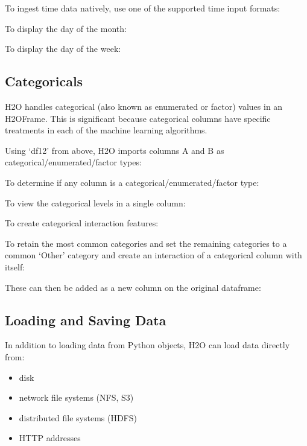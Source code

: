 {To ingest time data natively, use one of the supported time input formats:


To display the day of the month:


To display the day of the week:


\subsection{Categoricals}
H2O handles categorical (also known as enumerated or factor) values in an H2OFrame.  This is significant because categorical
columns have specific treatments in each of the machine learning algorithms.

Using `df12' from above, H2O imports columns A and B as categorical/enumerated/factor types:


To determine if any column is a categorical/enumerated/factor type:


To view the categorical levels in a single column:


To create categorical interaction features:


\newpage
To retain the most common categories and set the remaining categories to a common `Other' category
 and create an interaction of a categorical column with itself:


These can then be added as a new column on the original dataframe:


\newpage
\subsection{Loading and Saving Data}
In addition to loading data from Python objects, H2O can load data directly from:
\begin{itemize}
\item disk
\item network file systems (NFS, S3)
\item distributed file systems (HDFS)
\item HTTP addresses
\end{itemize}

}
